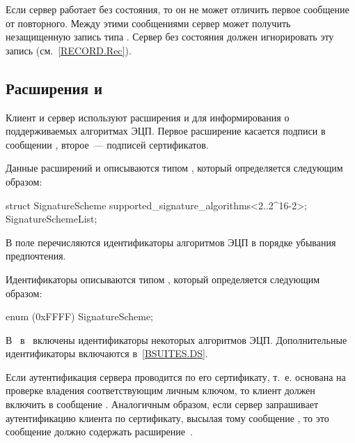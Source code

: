 
Если сервер работает без состояния, то он не может отличить первое сообщение 
 от повторного. Между этими сообщениями сервер может 
получить незащищенную запись типа . Сервер без 
состояния должен игнорировать эту запись (см.~\ref{RECORD.Rec}).

\subsection{Расширения  и 
}\label{HS.Ext.sa} 

Клиент и сервер используют расширения  и 
 для информирования о поддерживаемых алгоритмах 
ЭЦП. Первое расширение касается подписи в сообщении 
, второе~--- подписей сертификатов.

Данные расширений  и 
 описываются типом , 
который определяется следующим образом:

\begin{codeblock}
struct {
  SignatureScheme supported_signature_algorithms<2..2^16-2>;
} SignatureSchemeList;
\end{codeblock}

В поле  перечисляются идентификаторы 
алгоритмов ЭЦП в порядке убывания предпочтения.

Идентификаторы описываются типом , который определяется 
следующим образом:

\begin{codeblock}
enum { (0xFFFF) } SignatureScheme;
\end{codeblock}

В~\cite{RFC8446} в~ включены идентификаторы некоторых
алгоритмов ЭЦП. Дополнительные идентификаторы включаются в~\ref{BSUITES.DS}.

Если аутентификация сервера проводится по его сертификату, т.~е. основана на 
проверке владения соответствующим личным ключом, то клиент должен включить 
 в сообщение .
%
Аналогичным образом, если сервер запрашивает аутентификацию клиента по 
сертификату, высылая тому сообщение , то это 
сообщение должно содержать расширение~.

